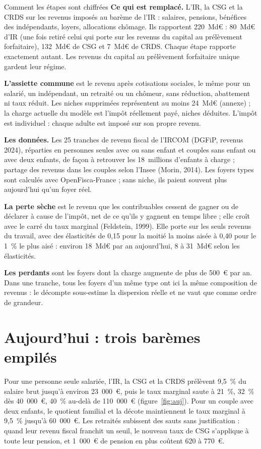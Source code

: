 \documentclass[11pt,a4paper]{article}
\begin{document}
\begin{encadre}{Comment les étapes sont chiffrées}
\textbf{Ce qui est remplacé.} L'IR, la CSG et la CRDS sur les revenus imposés au barème de l'IR : salaires,
pensions, bénéfices des indépendants, loyers, allocations chômage. Ils rapportent 220~Md€ : 80~Md€ d'IR
(une fois retiré celui qui porte sur les revenus du capital au prélèvement forfaitaire), 132~Md€ de CSG et
7~Md€ de CRDS. Chaque étape rapporte exactement autant. Les revenus du capital au prélèvement forfaitaire
unique gardent leur régime.

\textbf{L'assiette commune} est le revenu après cotisations sociales, le même pour un salarié, un
indépendant, un retraité ou un chômeur, sans réduction, abattement ni taux réduit. Les niches supprimées
représentent au moins 24~Md€ (annexe) ; la charge actuelle du modèle est l'impôt réellement payé, niches
déduites. L'impôt est individuel : chaque adulte est imposé sur son propre revenu.

\textbf{Les données.} Les 25 tranches de revenu fiscal de l'IRCOM (DGFiP, revenus 2024), réparties en
personnes seules avec ou sans enfant et couples sans enfant ou avec deux enfants, de façon à retrouver les
18~millions d'enfants à charge ; partage des revenus dans les couples selon l'Insee (Morin, 2014). Les foyers
types sont calculés avec OpenFisca-France ; sans niche, ils paient souvent plus aujourd'hui qu'un foyer réel.

\textbf{La perte sèche} est le revenu que les contribuables cessent de gagner ou de déclarer à cause de
l'impôt, net de ce qu'ils y gagnent en temps libre ; elle croît avec le carré du taux marginal (Feldstein,
1999). Elle porte sur les seuls revenus du travail, avec des élasticités de 0,15 pour la moitié la moins
aisée à 0,40 pour le 1~\% le plus aisé : environ 18~Md€ par an aujourd'hui, 8 à 31~Md€ selon les
élasticités.

\textbf{Les perdants} sont les foyers dont la charge augmente de plus de 500~€ par an. Dans une tranche,
tous les foyers d'un même type ont ici la même composition de revenus : le décompte sous-estime la
dispersion réelle et ne vaut que comme ordre de grandeur.
\end{encadre}

\section{Aujourd'hui : trois barèmes empilés}

Pour une personne seule salariée, l'IR, la CSG et la CRDS prélèvent 9,5~\% du salaire brut jusqu'à
environ 23~000~€, puis le taux marginal saute à 21~\%, 32~\% dès 40~000~€, 40~\% au-delà de 110~000~€
(figure~\ref{fig:auj}). Pour un couple avec deux enfants, le quotient familial et la décote maintiennent le
taux marginal à 9,5~\% jusqu'à 60~000~€. Les retraités subissent des sauts sans justification : quand leur
revenu fiscal franchit un seuil, le nouveau taux de CSG s'applique à toute leur pension, et 1~000~€ de pension
en plus coûtent 620 à 770~€.
\end{document}
